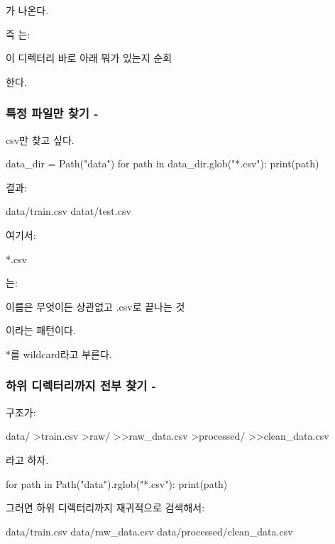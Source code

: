 가 나온다.

즉 는:

\begin{dhksmry}[centered]
이 디렉터리 바로 아래 뭐가 있는지 순회
\end{dhksmry}

한다.

\subsubsection{특정 파일만 찾기 - }

csv만 찾고 싶다.

\begin{dhkcode}
data_dir = Path("data")
for path in data_dir.glob("*.csv"):
    print(path)
\end{dhkcode}

결과:

\begin{dhkzsh}
data/train.csv
datat/test.csv
\end{dhkzsh}

여기서:

\begin{dhkzsh}
*.csv
\end{dhkzsh}

는:

\begin{dhksmry}[centered]
이름은 무엇이든 상관없고 .csv로 끝나는 것
\end{dhksmry}

이라는 패턴이다.

*를 wildcard라고 부른다.

\subsubsection{하위 디렉터리까지 전부 찾기 - }

구조가:

\begin{dhkdir}
data/
>train.csv
>raw/
>>raw_data.csv
>processed/
>>clean_data.csv
\end{dhkdir}

라고 하자.

\begin{dhkcode}
for path in Path("data").rglob("*.csv"):
    print(path)  
\end{dhkcode}

그러면 하위 디렉터리까지 재귀적으로 검색해서:

\begin{dhkzsh}
data/train.csv
data/raw_data.csv
data/processed/clean_data.csv
\end{dhkzsh}

